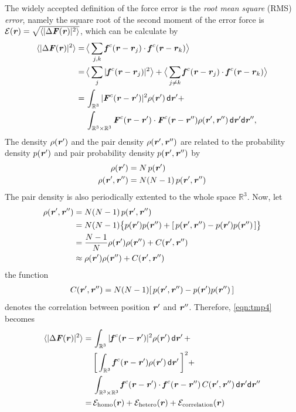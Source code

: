 \documentclass[aps,pre,preprint]{revtex4}
\renewcommand{\v}[1]{\textbf{\textit{#1}}}
\renewcommand{\d}[1]{\textsf{#1}}
\begin{document}
The widely accepted definition of the force error is the \emph{root mean
square} (RMS) \emph{error}, namely the square root of the second moment of the
error force is $\mathcal E(\v r) = \sqrt{\langle\vert\Delta\v F(\v
  r)\vert^2\rangle}$, which can be calculate by
\begin{align} \nonumber
  \langle\vert\Delta\v F(\v r)\vert^2\rangle
  =\,&
  \big\langle\sum_{j,k}\v f^c(\v r - \v r_j)\cdot\v f^c(\v r - \v r_k)\big\rangle \\ \nonumber
  =\,&
  \big\langle\sum_j\vert\v f^c(\v r - \v r_j)\vert^2\big\rangle +
  \big\langle\sum_{j\neq k}\v f^c(\v r - \v r_j)\cdot\v f^c(\v r - \v r_k)\big\rangle \\ \nonumber
  =\,&
  \int_{\mathbb R^3}\vert\v F^c(\v r - \v r')\vert^2\rho(\v r')\,\d d\v r'
  + \\\label{eqn:tmp4}
  \,&
  \int_{\mathbb R^3\times\mathbb R^3}\v F^c(\v r - \v r')\cdot\v F^c(\v r - \v r'')\rho(\v r', \v r'')\,\d d\v r'\d d\v r'',
\end{align}
The density $\rho(\v r')$ and the pair density $\rho(\v r', \v r'')$
are related to the probability density $p(\v r')$ and pair probability
density $p(\v r', \v r'')$ by
\begin{align}
  \rho(\v r') &= N\,p(\v r') \\
  \rho(\v r', \v r'') &= N(N-1)\,p(\v r', \v r'')
\end{align}
The pair density is also periodically extented to the whole space $\mathbb
R^3$.
Now, let
\begin{align} \nonumber
  \rho(\v r', \v r'')
  & = N (N-1) \,p(\v r', \v r'') \\\nonumber
  & = N (N-1) \big\{ p(\v r')p(\v r'') + [\,p(\v r', \v r'') -  p(\v r')p(\v r'')\,]\big\} \\\nonumber
  &= \frac{N-1}N \rho(\v r')\rho(\v r'') + C (\v r', \v r'')\\ \label{eqn:tmp7}
  &\approx \rho(\v r')\rho(\v r'') + C (\v r', \v r'')
\end{align}
the function
\begin{align}
C (\v r', \v r'') = N (N-1) [\,p(\v r', \v r'') -  p(\v r')p(\v r'')\,]
\end{align}
denotes the correlation between
position $\v r'$ and $\v r''$. Therefore, \eqref{eqn:tmp4} becomes
\begin{align} \nonumber
  \langle\vert\Delta\v F(\v r)\vert^2\rangle
  = &\,
  \int_{\mathbb R^3}\vert\v f^c(\v r - \v r')\vert^2\rho(\v r')\,\d d\v r' \,+ \\\nonumber
  &\,
  \bigg[\int_{\mathbb R^3}\v f^c(\v r - \v r')\rho(\v r')\,\d d\v r'\,\bigg]^2 + \\\nonumber
  &\,
  \int_{\mathbb R^3\times\mathbb R^3}\v f^c(\v r - \v r')\cdot\v f^c(\v r - \v r'')\,C(\v r', \v r'')\,\d d\v r'\d d\v r'' \\\label{eqn:tmp5}
  = &\,
  \mathcal E_{\textrm{homo}}(\v r) +
  \mathcal E_{\textrm{hetero}}(\v r) +
  \mathcal E_{\textrm{correlation}}(\v r)
\end{align}
\end{document}
